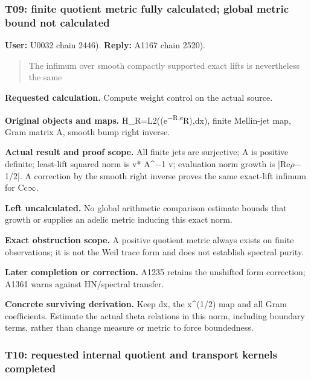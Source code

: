 \documentclass[10pt,a4paper,oneside]{report}
\begin{document}
\subsubsection{T09: finite quotient metric fully calculated; global
metric bound not
calculated}\label{t09-finite-quotient-metric-fully-calculated-global-metric-bound-not-calculated}

\textbf{User:} U0032
\protect{} chain 2446).
\textbf{Reply:} A1167
\protect{} chain 2520).

\begin{quote}
The infimum over smooth compactly supported exact lifts is nevertheless
the same
\end{quote}

\textbf{Requested calculation.} Compute weight control on the actual
source.

\textbf{Original objects and maps.}
H\_R=L2((e\textsuperscript{\allowbreak{}\ensuremath{−}\allowbreak{}R,e}R),dx),
finite Mellin-jet map, Gram matrix A, smooth bump right inverse.

\textbf{Actual result and proof scope.} All finite jets are surjective;
A is positive definite; least-lift squared norm is v*
A\textasciicircum{}\allowbreak{}\ensuremath{−}\allowbreak{}1 v;
evaluation norm growth is
|Re\allowbreak{}\ensuremath{ρ}\allowbreak{}\allowbreak{}\ensuremath{−}\allowbreak{}1/2|.
A correction by the smooth right inverse proves the same exact-lift
infimum for Cc\allowbreak{}\ensuremath{∞}\allowbreak{}.

\textbf{Left uncalculated.} No global arithmetic comparison estimate
bounds that growth or supplies an adelic metric inducing this exact
norm.

\textbf{Exact obstruction scope.} A positive quotient metric always
exists on finite observations; it is not the Weil trace form and does
not establish spectral purity.

\textbf{Later completion or correction.} A1235 retains the unshifted
form correction; A1361 warns against HN/spectral transfer.

\textbf{Concrete surviving derivation.} Keep dx, the x\^{}(1/2) map and
all Gram coefficients. Estimate the actual theta relations in this norm,
including boundary terms, rather than change measure or metric to force
boundedness.

\subsubsection{T10: requested internal quotient and transport kernels
completed}\label{t10-requested-internal-quotient-and-transport-kernels-completed}
\end{document}
